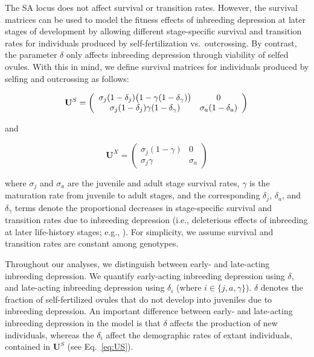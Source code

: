 \documentclass[11pt]{article}
\def\mbf#1{\mathbf{#1}}
\begin{document}
The SA locus does not affect survival or transition rates. However, the survival matrices can be used to model the fitness effects of inbreeding depression at later stages of development by allowing different stage-specific survival and transition rates for individuals produced by self-fertilization vs.~outcrossing. By contrast, the parameter $\delta$ only affects inbreeding depression through viability of selfed ovules. With this in mind, we define survival matrices for individuals produced by selfing and outcrossing as follows:
\begin{linenomath*}
\begin{equation} \label{eq:US}
	\mbf{U}^S = \left(
					\begin{array}{cc}
						\sigma_j (1 - \delta_j) \big(1 - \gamma (1 - \delta_{\gamma}) \big) & 0 \\
						\sigma_j (1 - \delta_j) \gamma (1 - \delta_{\gamma})      & \sigma_a (1 - \delta_a)
					\end{array}
				\right) \\
\end{equation}
\end{linenomath*}
\noindent and 
\begin{linenomath*}
\begin{equation}\label{eq:UX}
	\mbf{U}^X = \left(
					\begin{array}{cc}
						\sigma_j(1 - \gamma) & 0 \\
						\sigma_j \gamma      & \sigma_a
					\end{array}
				\right)
\end{equation}
\end{linenomath*}

\noindent where $\sigma_j$ and $\sigma_a$ are the juvenile and adult stage survival rates, $\gamma$ is the maturation rate from juvenile to adult stages, and the corresponding $\delta_j$, $\delta_a$, and $\delta_{\gamma}$ terms denote the proportional decreases in stage-specific survival and transition rates due to inbreeding depression (i.e., deleterious effects of inbreeding at later life-history stages; e.g., \citealt{HarderRoutely2006}). For simplicity, we assume survival and transition rates are constant among genotypes. 

Throughout our analyses, we distinguish between early- and late-acting inbreeding depression. We quantify early-acting inbreeding depression using $\delta$, and late-acting inbreeding depression using $\delta_i$ (where $i \in \{j,a,\gamma\}$). $\delta$ denotes the fraction of self-fertilized ovules that do not develop into juveniles due to inbreeding depression. An important difference between early- and late-acting inbreeding depression in the model is that $\delta$ affects the production of new individuals, whereas the $\delta_i$ affect the demographic rates of extant individuals, contained in $\mbf{U}^S$ (see Eq.~\ref{eq:US}).
\end{document}
